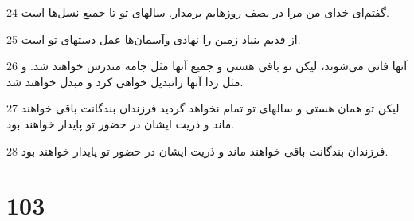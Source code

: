 \par 24 گفتم‌ای خدای من مرا در نصف روزهایم برمدار. سالهای تو تا جمیع نسل‌ها است.
\par 25 از قدیم بنیاد زمین را نهادی وآسمان‌ها عمل دستهای تو است.
\par 26 آنها فانی می‌شوند، لیکن تو باقی هستی و جمیع آنها مثل جامه مندرس خواهند شد. و مثل ردا آنها راتبدیل خواهی کرد و مبدل خواهند شد.
\par 27 لیکن تو همان هستی و سالهای تو تمام نخواهد گردید.فرزندان بندگانت باقی خواهند ماند و ذریت ایشان در حضور تو پایدار خواهند بود.
\par 28 فرزندان بندگانت باقی خواهند ماند و ذریت ایشان در حضور تو پایدار خواهند بود.
 
\chapter{103}

